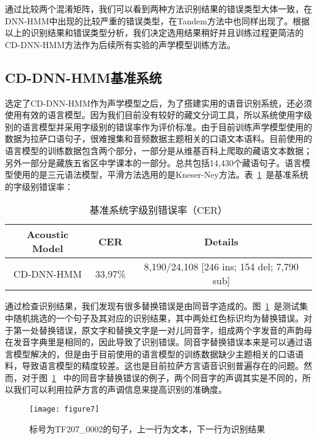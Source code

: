 通过比较两个混淆矩阵，我们可以看到两种方法识别结果的错误类型大体一致，在DNN-HMM中出现的比较严重的错误类型，在Tandem方法中也同样出现了。根据以上的识别结果和错误类型分析，我们决定选用结果稍好并且训练过程更简洁的CD-DNN-HMM方法作为后续所有实验的声学模型训练方法。
\subsection{CD-DNN-HMM基准系统}
选定了CD-DNN-HMM作为声学模型之后，为了搭建实用的语音识别系统，还必须使用有效的语言模型。因为我们目前没有较好的藏文分词工具，所以系统使用字级别的语言模型并采用字级别的错误率作为评价标准。由于目前训练声学模型使用的数据为拉萨口语句子，很难搜集和音频数据主题相关的口语文本语料。目前使用的语言模型的训练数据包含两个部分，一部分是从维基百科上爬取的藏语文本数据；另外一部分是藏族五省区中学课本的一部分。总共包括14,430个藏语句子。语言模型使用的是三元语法模型，平滑方法选用的是Kneser-Ney方法\cite{kneser1995improved}。表~\ref{tab:table3}~是基准系统的字级别错误率：
\begin{table}[htbp]
\caption{基准系统字级别错误率（CER）}\label{tab:table3}
\vspace{0.5em}\centering\wuhao
\begin{tabular}{ccc}
\toprule[1.5pt]
Acoustic Model & CER & Details \\
\midrule[1pt]
 CD-DNN-HMM & 33.97\% & 8,190/24,108 [246 ins; 154 del; 7,790 sub] \\
\bottomrule[1.5pt]
\end{tabular}
\vspace{\baselineskip}
\end{table}

通过检查识别结果，我们发现有很多替换错误是由同音字造成的。图~\ref{fig:figure7}~是测试集中随机挑选的一个句子及其对应的识别结果，其中两处红色标识均为替换错误。对于第一处替换错误，原文字和替换文字是一对儿同音字，组成两个字发音的声韵母在发音字典里是相同的，因此导致了识别错误。同音字替换错误本来是可以通过语言模型解决的，但是由于目前使用的语言模型的训练数据缺少主题相关的口语语料，导致语言模型的精度较差。这也是目前拉萨方言语音识别普遍存在的问题。然而，对于图~\ref{fig:figure7}~ 中的同音字替换错误的例子，两个同音字的声调其实是不同的，所以我们可以利用拉萨方言的声调信息来提高识别的准确度。
\begin{figure}[htbp]
\centering
\texttt{[image: figure7]}
\caption{标号为TF207\_0002的句子，上一行为文本，下一行为识别结果}\label{fig:figure7}
\vspace{\baselineskip}
\end{figure}

